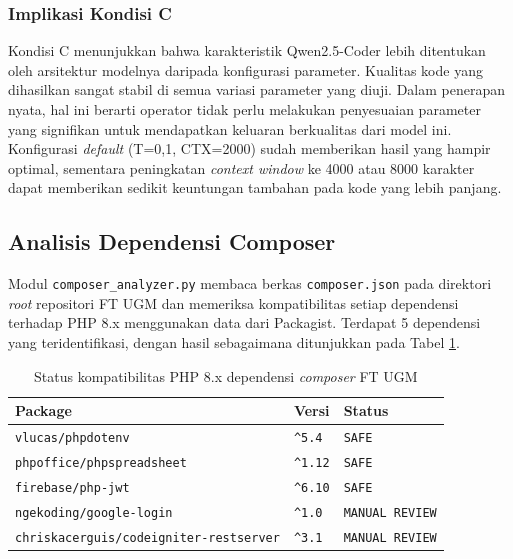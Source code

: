 \subsubsection{Implikasi Kondisi C}

Kondisi C menunjukkan bahwa karakteristik Qwen2.5-Coder lebih 
ditentukan oleh arsitektur modelnya daripada konfigurasi parameter. 
Kualitas kode yang dihasilkan sangat stabil di semua variasi 
parameter yang diuji. Dalam penerapan nyata, hal ini berarti operator tidak perlu melakukan 
penyesuaian parameter yang signifikan untuk mendapatkan keluaran 
berkualitas dari model ini. Konfigurasi \textit{default} (T=0,1, CTX=2000) sudah 
memberikan hasil yang hampir optimal, sementara peningkatan 
\textit{context window} ke 4000 atau 8000 karakter dapat 
memberikan sedikit keuntungan tambahan pada kode yang lebih panjang.

\subsection{Analisis Dependensi Composer}

Modul \texttt{composer\_analyzer.py} membaca berkas \texttt{composer.json} 
pada direktori \textit{root} repositori FT UGM dan memeriksa kompatibilitas 
setiap dependensi terhadap PHP 8.x menggunakan data dari Packagist. 
Terdapat 5 dependensi yang teridentifikasi, dengan hasil sebagaimana 
ditunjukkan pada Tabel \ref{tab:composer-ft}.

\begin{table}[h]
\caption{Status kompatibilitas PHP 8.x dependensi \textit{composer} FT UGM}
\vspace{0.5em}
\centering
\label{tab:composer-ft}
\begin{tabularx}{\textwidth}{|l|l|X|}
\hline
\textbf{Package} & \textbf{Versi} & \textbf{Status} \\
\hline \hline
\texttt{vlucas/phpdotenv} & \texttt{\^{}5.4} & \texttt{SAFE} \\
\hline
\texttt{phpoffice/phpspreadsheet} & \texttt{\^{}1.12} & \texttt{SAFE} \\
\hline
\texttt{firebase/php-jwt} & \texttt{\^{}6.10} & \texttt{SAFE} \\
\hline
\texttt{ngekoding/google-login} & \texttt{\^{}1.0} & \texttt{MANUAL REVIEW} \\
\hline
\texttt{chriskacerguis/codeigniter-restserver} & \texttt{\^{}3.1} & \texttt{MANUAL REVIEW} \\
\hline
\end{tabularx}
\end{table}

